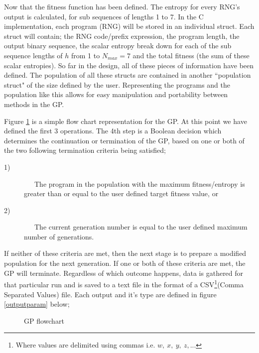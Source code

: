 \documentclass[a4paper,10.5pt]{article}
\begin{document}
Now that the fitness function has been defined. The entropy for every RNG's output is calculated, for sub sequences of lengths 1 to 7.
In the C implementation, each program (RNG) will be stored in an individual struct. Each struct will contain; the RNG code/prefix expression, the program length, the output binary sequence, the scalar entropy break down for each of the sub sequence lengths of $h$ from 1 to $N_{max} = 7$ and the total fitness (the sum of these scalar entropies). So far in the design, all of these pieces of information have been defined. The population of all these structs are contained in another ``population struct" of the size defined by the user. Representing the programs and the population like this allows for easy manipulation and portability between methods in the GP.

Figure \ref{simpleflow} is a simple flow chart representation for the GP. At this point we have defined the first 3 operations. The 4th step is a Boolean decision which determines the continuation or termination of the GP, based on one or both of the two following termination criteria being satisfied;
\begin{description}
  \item[1)]
  \ \ \ The program in the population with the maximum fitness/entropy is greater than or equal to the user defined target fitness value, or
  \item[2)]
 \ \ \ The current generation number is equal to the user defined maximum number of generations.
\end{description}

If neither of these criteria are met, then the next stage is to prepare a modified population for the next generation. If one or both of these criteria are met, the GP will terminate. Regardless of which outcome happens, data is gathered for that particular run and is saved to a text file in the format of a CSV\footnote{Where values are delimited using commas i.e. $w,\ x,\ y,\ z, ...$}(Comma Separated Values) file. Each output and it's type are defined in figure \ref{outputparam} below;

\begin{figure}
\caption{GP flowchart}
\label{simpleflow}
\end{figure}
\end{document}
